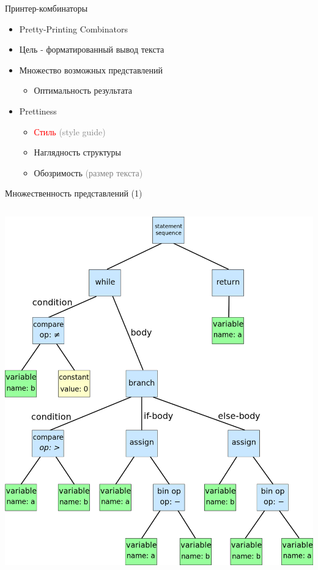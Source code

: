 \documentclass[sans]{beamer}
\begin{document}
\begin{frame}{Принтер-комбинаторы}
  \begin{itemize}
    \item Pretty-Printing Combinators
    \item Цель - форматированный вывод текста
    \item Множество возможных представлений
        \begin{itemize}
           \item Оптимальность результата
        \end{itemize}
    \item Prettiness
      \begin{itemize}
        \item \textcolor{red}{Стиль} \textcolor{gray}{(style guide)}
        \item Наглядность структуры
        \item Обозримость \textcolor{gray}{(размер текста)}
     \end{itemize}

  \end{itemize}
\end{frame}

\begin{frame}{Множественность представлений (1)}
  \begin{columns}
    \begin{column}{0.65\linewidth}
      \includegraphics[width = \linewidth]{images/ast.png}
    \end{column}
  \end{columns}
\end{frame}
\end{document}

